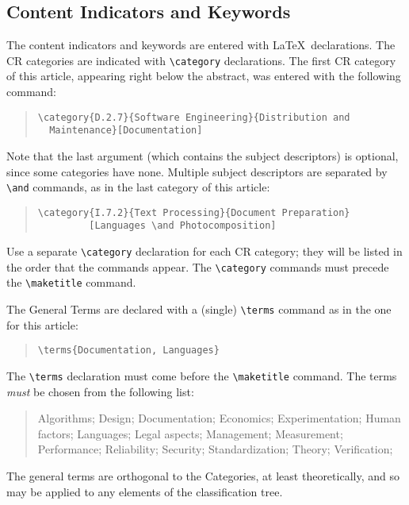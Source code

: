 \documentclass[acmtocl]{acmtrans2m}
\begin{document}
\subsection{Content Indicators and Keywords}

The content indicators and keywords are entered with \LaTeX\ 
declarations.  The CR categories are indicated with \verb|\category|
declarations.  The first CR category of this article, appearing
right below the abstract, was entered with the following command:
\begin{quote}
\begin{verbatim}
\category{D.2.7}{Software Engineering}{Distribution and 
  Maintenance}[Documentation]
\end{verbatim}
\end{quote}
Note that the last argument (which contains the subject descriptors)
is optional, since some categories have none.  Multiple subject 
descriptors
are separated by \verb|\and| commands, as in the last category of
this article:
\begin{quote}
\begin{verbatim}
\category{I.7.2}{Text Processing}{Document Preparation}
         [Languages \and Photocomposition]
\end{verbatim}
\end{quote}
Use a separate \verb|\category| declaration for each CR category;
they will be listed in the order that the commands appear.  The
\verb|\category| commands must precede the \verb|\maketitle|
command.

The General Terms are declared with a (single) \verb|\terms|
command as in the one for this article:
\begin{quote}
\begin{verbatim}
\terms{Documentation, Languages}
\end{verbatim}
\end{quote}
The \verb|\terms| declaration must come before the \verb|\maketitle|
command.  The terms {\it must} be chosen from the following list:
\begin{quote}
Algorithms; 
Design; 
Documentation; 
Economics; 
Experimentation; 
Human factors; 
Languages; 
Legal aspects; 
Management; 
Measurement; 
Performance; 
Reliability; 
Security; 
Standardization; 
Theory; 
Verification; 
\end{quote}
The general terms are
orthogonal to the Categories, at least theoretically, and so
may be applied to any elements of the classification tree.
\end{document}
